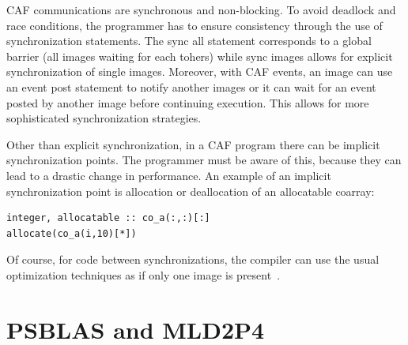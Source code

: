 \documentclass{IOS-Book-Article}
\begin{document}
CAF communications are synchronous and non-blocking. 
To avoid deadlock and race conditions, the programmer has to ensure consistency through the use of synchronization statements.
The sync all statement corresponds to a global barrier (all images waiting for each tohers) while sync images allows for explicit synchronization of single images. Moreover, with CAF events, an image can use an event post statement to notify another images or it can wait for an event posted by another image before continuing execution. This allows for more sophisticated synchronization strategies.  

Other than explicit synchronization, in a CAF program there can be implicit synchronization points. The programmer must be aware of this, because they can lead to a drastic change in performance.
An example of an implicit synchronization point is allocation or deallocation of an allocatable coarray:

\begin{lstlisting}
integer, allocatable :: co_a(:,:)[:]
allocate(co_a(i,10)[*])
\end{lstlisting}

Of course, for code between synchronizations, the compiler can use the usual optimization techniques as if only one image is present~\cite{CAF}.

\section{PSBLAS and MLD2P4}
\end{document}
